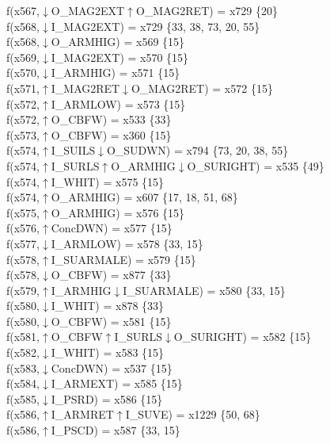 f(x567,$\downarrow$O\_MAG2EXT$\uparrow$O\_MAG2RET) = x729 \{20\} \\  
f(x568,$\downarrow$I\_MAG2EXT) = x729 \{33, 38, 73, 20, 55\} \\  
f(x568,$\downarrow$O\_ARMHIG) = x569 \{15\} \\  
f(x569,$\downarrow$I\_MAG2EXT) = x570 \{15\} \\  
f(x570,$\downarrow$I\_ARMHIG) = x571 \{15\} \\  
f(x571,$\uparrow$I\_MAG2RET$\downarrow$O\_MAG2RET) = x572 \{15\} \\  
f(x572,$\uparrow$I\_ARMLOW) = x573 \{15\} \\  
f(x572,$\uparrow$O\_CBFW) = x533 \{33\} \\  
f(x573,$\uparrow$O\_CBFW) = x360 \{15\} \\  
f(x574,$\uparrow$I\_SUILS$\downarrow$O\_SUDWN) = x794 \{73, 20, 38, 55\} \\  
f(x574,$\uparrow$I\_SURLS$\uparrow$O\_ARMHIG$\downarrow$O\_SURIGHT) = x535 \{49\} \\  
f(x574,$\uparrow$I\_WHIT) = x575 \{15\} \\  
f(x574,$\uparrow$O\_ARMHIG) = x607 \{17, 18, 51, 68\} \\  
f(x575,$\uparrow$O\_ARMHIG) = x576 \{15\} \\  
f(x576,$\uparrow$ConcDWN) = x577 \{15\} \\  
f(x577,$\downarrow$I\_ARMLOW) = x578 \{33, 15\} \\  
f(x578,$\uparrow$I\_SUARMALE) = x579 \{15\} \\  
f(x578,$\downarrow$O\_CBFW) = x877 \{33\} \\  
f(x579,$\uparrow$I\_ARMHIG$\downarrow$I\_SUARMALE) = x580 \{33, 15\} \\  
f(x580,$\downarrow$I\_WHIT) = x878 \{33\} \\  
f(x580,$\downarrow$O\_CBFW) = x581 \{15\} \\  
f(x581,$\uparrow$O\_CBFW$\uparrow$I\_SURLS$\downarrow$O\_SURIGHT) = x582 \{15\} \\  
f(x582,$\downarrow$I\_WHIT) = x583 \{15\} \\  
f(x583,$\downarrow$ConcDWN) = x537 \{15\} \\  
f(x584,$\downarrow$I\_ARMEXT) = x585 \{15\} \\  
f(x585,$\downarrow$I\_PSRD) = x586 \{15\} \\  
f(x586,$\uparrow$I\_ARMRET$\uparrow$I\_SUVE) = x1229 \{50, 68\} \\  
f(x586,$\uparrow$I\_PSCD) = x587 \{33, 15\} \\  
